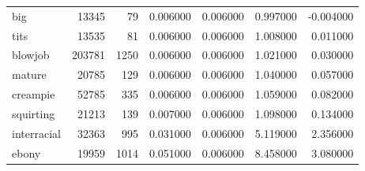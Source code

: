 \begin{tabular}{lrrrrrr}
big & 13345 & 79 & 0.006000 & 0.006000 & 0.997000 & -0.004000 \\
tits & 13535 & 81 & 0.006000 & 0.006000 & 1.008000 & 0.011000 \\
blowjob & 203781 & 1250 & 0.006000 & 0.006000 & 1.021000 & 0.030000 \\
mature & 20785 & 129 & 0.006000 & 0.006000 & 1.040000 & 0.057000 \\
creampie & 52785 & 335 & 0.006000 & 0.006000 & 1.059000 & 0.082000 \\
squirting & 21213 & 139 & 0.007000 & 0.006000 & 1.098000 & 0.134000 \\
interracial & 32363 & 995 & 0.031000 & 0.006000 & 5.119000 & 2.356000 \\
ebony & 19959 & 1014 & 0.051000 & 0.006000 & 8.458000 & 3.080000 \\
\bottomrule
\end{tabular}
